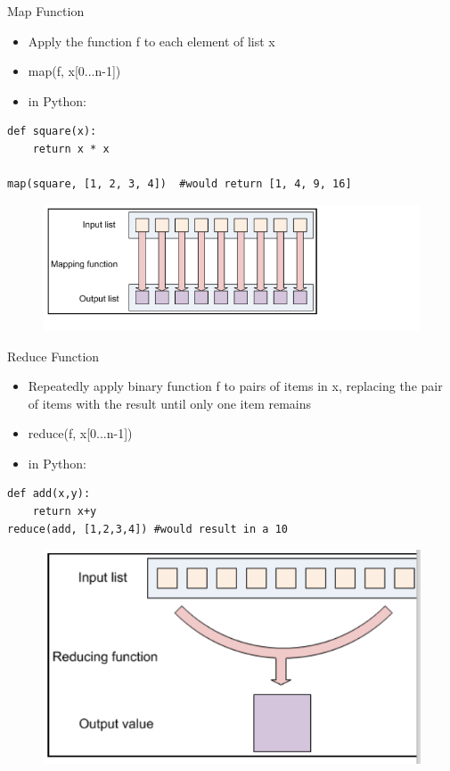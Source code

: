 \documentclass{beamer}
\begin{document}
\begin{frame}[fragile]{Map Function}
\begin{itemize}
\item Apply the function f to each element of list x
\item map(f, x[0...n-1])
\item in Python: \\
\end{itemize}
\begin{lstlisting}
def square(x):  
	return x * x 

map(square, [1, 2, 3, 4])  #would return [1, 4, 9, 16]
 \end{lstlisting}
\begin{figure}
		\includegraphics[scale=0.23]{img/map}
\end{figure}
\end{frame}

\begin{frame}[fragile]{Reduce Function}
\begin{itemize}
\item Repeatedly apply binary function f to pairs of items in x, replacing the pair of items with the result until only one item remains
\item reduce(f, x[0...n-1])
\item in Python: \\
\end{itemize}
\begin{lstlisting}
def add(x,y): 
	return x+y 
reduce(add, [1,2,3,4]) #would result in a 10
\end{lstlisting}
\begin{figure}
		\includegraphics[scale=0.23]{img/reduce}
\end{figure}
\end{frame}
\end{document}
